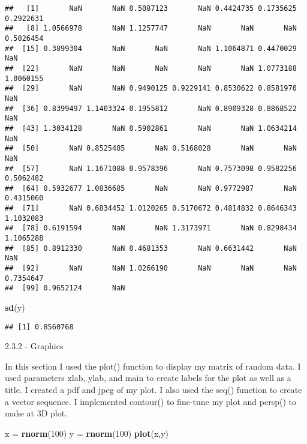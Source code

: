 \documentclass[]{article}
\newenvironment{Shaded}{\begin{snugshade}}{\end{snugshade}}
\newcommand{\KeywordTok}[1]{\textcolor[rgb]{0.13,0.29,0.53}{\textbf{#1}}}
\newcommand{\DecValTok}[1]{\textcolor[rgb]{0.00,0.00,0.81}{#1}}
\newcommand{\StringTok}[1]{\textcolor[rgb]{0.31,0.60,0.02}{#1}}
\newcommand{\NormalTok}[1]{#1}
\begin{document}
\begin{verbatim}
##   [1]       NaN       NaN 0.5087123       NaN 0.4424735 0.1735625 0.2922631
##   [8] 1.0566978       NaN 1.1257747       NaN       NaN       NaN 0.5026454
##  [15] 0.3899304       NaN       NaN       NaN 1.1064871 0.4470029       NaN
##  [22]       NaN       NaN       NaN       NaN       NaN 1.0773188 1.0060155
##  [29]       NaN       NaN 0.9490125 0.9229141 0.8530622 0.8581970       NaN
##  [36] 0.8399497 1.1403324 0.1955812       NaN 0.8909328 0.8868522       NaN
##  [43] 1.3034128       NaN 0.5902861       NaN       NaN 1.0634214       NaN
##  [50]       NaN 0.8525485       NaN 0.5168028       NaN       NaN       NaN
##  [57]       NaN 1.1671088 0.9578396       NaN 0.7573098 0.9582256 0.5062482
##  [64] 0.5932677 1.0836685       NaN       NaN 0.9772987       NaN 0.4315060
##  [71]       NaN 0.6834452 1.0120265 0.5170672 0.4814832 0.8646343 1.1032083
##  [78] 0.6191594       NaN       NaN 1.3173971       NaN 0.8298434 1.1065288
##  [85] 0.8912330       NaN 0.4681353       NaN 0.6631442       NaN       NaN
##  [92]       NaN       NaN 1.0266190       NaN       NaN       NaN 0.7354647
##  [99] 0.9652124       NaN
\end{verbatim}

\begin{Shaded}
\begin{Highlighting}[]
\KeywordTok{sd}\NormalTok{(y)}
\end{Highlighting}
\end{Shaded}

\begin{verbatim}
## [1] 0.8560768
\end{verbatim}

2.3.2 - Graphics

In this section I used the plot() function to display my matrix of
random data. I used parameters xlab, ylab, and main to create labels for
the plot as well as a title. I created a pdf and jpeg of my plot. I also
used the seq() function to create a vector sequence. I implemented
contour() to fine-tune my plot and persp() to make at 3D plot.

\begin{Shaded}
\begin{Highlighting}[]
\NormalTok{x =}\StringTok{ }\KeywordTok{rnorm}\NormalTok{(}\DecValTok{100}\NormalTok{)}
\NormalTok{y =}\StringTok{ }\KeywordTok{rnorm}\NormalTok{(}\DecValTok{100}\NormalTok{)}
\KeywordTok{plot}\NormalTok{(x,y)}
\end{Highlighting}
\end{Shaded}
\end{document}
